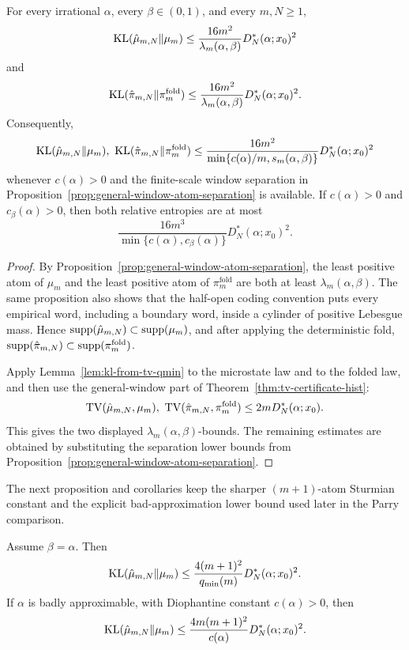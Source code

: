 \begin{theorem}\label{thm:general-window-relative-entropy-certificate}
For every irrational \(\alpha\), every \(\beta\in(0,1)\), and every
\(m,N\ge1\),
\[
\operatorname{KL}(\hat\mu_{m,N}\|\mu_m)
\le
\frac{16m^2}{\lambda_m(\alpha,\beta)}
D_N^*(\alpha;x_0)^2
\]
and
\[
\operatorname{KL}(\hat\pi_{m,N}\|\pi_m^{\mathrm{fold}})
\le
\frac{16m^2}{\lambda_m(\alpha,\beta)}
D_N^*(\alpha;x_0)^2 .
\]
Consequently,
\[
\operatorname{KL}(\hat\mu_{m,N}\|\mu_m),\
\operatorname{KL}(\hat\pi_{m,N}\|\pi_m^{\mathrm{fold}})
\le
\frac{16m^2}
{\min\{c(\alpha)/m,s_m(\alpha,\beta)\}}
D_N^*(\alpha;x_0)^2
\]
whenever \(c(\alpha)>0\) and the finite-scale window separation in
Proposition~\ref{prop:general-window-atom-separation} is available.  If
\(c(\alpha)>0\) and \(c_\beta(\alpha)>0\), then both relative entropies are at
most
\[
\frac{16m^3}{\min\{c(\alpha),c_\beta(\alpha)\}}
D_N^*(\alpha;x_0)^2 .
\]
\end{theorem}

\begin{proof}
By Proposition~\ref{prop:general-window-atom-separation}, the least positive
atom of \(\mu_m\) and the least positive atom of
\(\pi_m^{\mathrm{fold}}\) are both at least
\(\lambda_m(\alpha,\beta)\).  The same proposition also shows that the
half-open coding convention puts every empirical word, including a boundary
word, inside a cylinder of positive Lebesgue mass.  Hence
\(\operatorname{supp}(\hat\mu_{m,N})\subset\operatorname{supp}(\mu_m)\), and after applying the
deterministic fold,
\(\operatorname{supp}(\hat\pi_{m,N})\subset\operatorname{supp}(\pi_m^{\mathrm{fold}})\).

Apply Lemma~\ref{lem:kl-from-tv-qmin} to the microstate law and to the folded
law, and then use the general-window part of
Theorem~\ref{thm:tv-certificate-hist}:
\[
\operatorname{TV}(\hat\mu_{m,N},\mu_m),\
\operatorname{TV}(\hat\pi_{m,N},\pi_m^{\mathrm{fold}})
\le 2mD_N^*(\alpha;x_0).
\]
This gives the two displayed \(\lambda_m(\alpha,\beta)\)-bounds.  The
remaining estimates are obtained by substituting the separation lower bounds
from Proposition~\ref{prop:general-window-atom-separation}.
\end{proof}

The next proposition and corollaries keep the sharper \((m+1)\)-atom Sturmian
constant and the explicit bad-approximation lower bound used later in the
Parry comparison.

\begin{proposition}\label{prop:sturmian-microstate-kl-certificate}
Assume \(\beta=\alpha\). Then
\[
\operatorname{KL}(\hat\mu_{m,N}\|\mu_m)
\le
\frac{4(m+1)^2}{q_{\min}(m)}D_N^*(\alpha;x_0)^2.
\]
If \(\alpha\) is badly approximable, with Diophantine constant
\(c(\alpha)>0\), then
\[
\operatorname{KL}(\hat\mu_{m,N}\|\mu_m)
\le
\frac{4m(m+1)^2}{c(\alpha)}D_N^*(\alpha;x_0)^2.
\]
\end{proposition}

